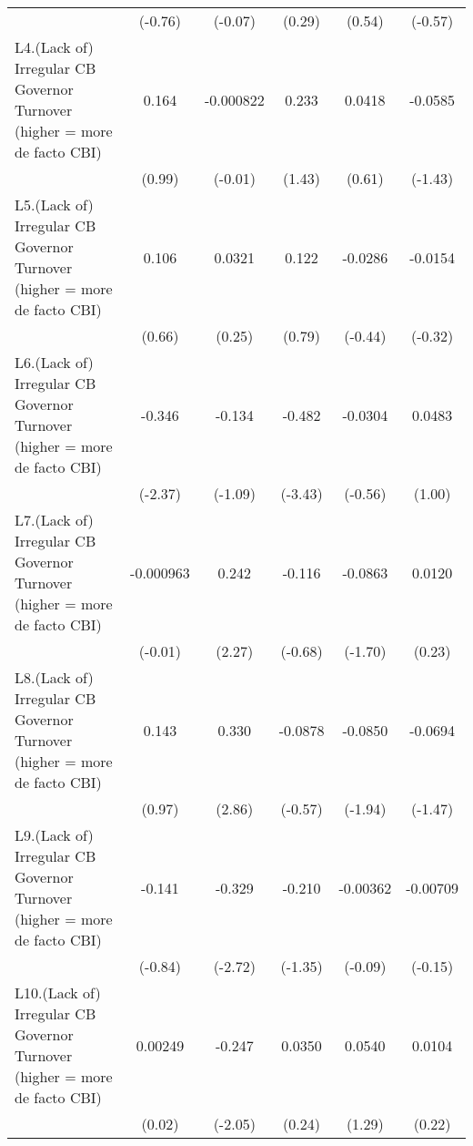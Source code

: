 {\begin{longtable}{l*{5}{c}}
                &  (-0.76)         &  (-0.07)         &   (0.29)         &   (0.54)         &  (-0.57)         \\
[1em]
L4.(Lack of) Irregular CB Governor Turnover (higher = more de facto CBI)&    0.164         &-0.000822         &    0.233         &   0.0418         &  -0.0585         \\
                &   (0.99)         &  (-0.01)         &   (1.43)         &   (0.61)         &  (-1.43)         \\
[1em]
L5.(Lack of) Irregular CB Governor Turnover (higher = more de facto CBI)&    0.106         &   0.0321         &    0.122         &  -0.0286         &  -0.0154         \\
                &   (0.66)         &   (0.25)         &   (0.79)         &  (-0.44)         &  (-0.32)         \\
[1em]
L6.(Lack of) Irregular CB Governor Turnover (higher = more de facto CBI)&   -0.346\sym{*}  &   -0.134         &   -0.482\sym{***}&  -0.0304         &   0.0483         \\
                &  (-2.37)         &  (-1.09)         &  (-3.43)         &  (-0.56)         &   (1.00)         \\
[1em]
L7.(Lack of) Irregular CB Governor Turnover (higher = more de facto CBI)&-0.000963         &    0.242\sym{*}  &   -0.116         &  -0.0863         &   0.0120         \\
                &  (-0.01)         &   (2.27)         &  (-0.68)         &  (-1.70)         &   (0.23)         \\
[1em]
L8.(Lack of) Irregular CB Governor Turnover (higher = more de facto CBI)&    0.143         &    0.330\sym{**} &  -0.0878         &  -0.0850         &  -0.0694         \\
                &   (0.97)         &   (2.86)         &  (-0.57)         &  (-1.94)         &  (-1.47)         \\
[1em]
L9.(Lack of) Irregular CB Governor Turnover (higher = more de facto CBI)&   -0.141         &   -0.329\sym{**} &   -0.210         & -0.00362         & -0.00709         \\
                &  (-0.84)         &  (-2.72)         &  (-1.35)         &  (-0.09)         &  (-0.15)         \\
[1em]
L10.(Lack of) Irregular CB Governor Turnover (higher = more de facto CBI)&  0.00249         &   -0.247\sym{*}  &   0.0350         &   0.0540         &   0.0104         \\
                &   (0.02)         &  (-2.05)         &   (0.24)         &   (1.29)         &   (0.22)         \\

\end{longtable}}
